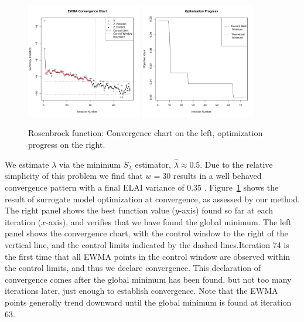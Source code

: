 \documentclass{article}
\def \roseVar {
	0.35
}
\def \roseLamb {
        0.5     
}
\begin{document}
%
\begin{figure}[htb]
  \includegraphics[width=0.45\textwidth]{./figures/ewmaConvChartRoseEasyEasyBW.pdf}
  \includegraphics[width=0.45\textwidth]{./figures/bestZRoseEasyEasyEnd.pdf}
  \caption{Rosenbrock function: Convergence chart on the left, optimization progress on the right.}
\label{fig:rosenbrock}
\end{figure}
We estimate $\lambda$ via the minimum $S_\lambda$ estimator, 
$\hat\lambda\approx\roseLamb$. Due to the relative simplicity of this problem 
we find that $w=30$ results in a well behaved convergence pattern with a final 
ELAI variance of \roseVar. Figure~\ref{fig:rosenbrock} shows the result of 
surrogate model optimization at convergence, as assessed by our method. The 
right panel shows the best function value ($y$-axis) found so far at each 
iteration ($x$-axis), and verifies that we have found the global minimum. The 
left panel shows the convergence chart, with the control window to the right 
of the vertical line, and the control limits indicated by the dashed 
lines.Iteration 74 is the first time that all EWMA points in the control 
window are observed within the control limits, and thus we declare 
convergence. This declaration of convergence comes after the global minimum 
has been found, but not too many iterations later, just enough to establish 
convergence. Note that the EWMA points generally trend downward until the 
global minimum is found at iteration 63.  
\end{document}
